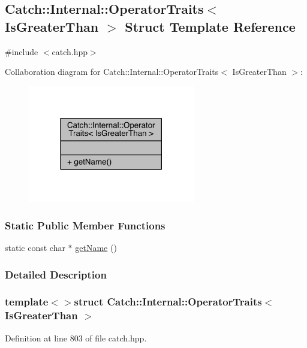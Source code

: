 \hypertarget{a00058}{}\subsection{Catch\+:\+:Internal\+:\+:Operator\+Traits$<$ Is\+Greater\+Than $>$ Struct Template Reference}
\label{a00058}


{\ttfamily \#include $<$catch.\+hpp$>$}



Collaboration diagram for Catch\+:\+:Internal\+:\+:Operator\+Traits$<$ Is\+Greater\+Than $>$\+:\nopagebreak
\begin{figure}[H]
\begin{center}
\leavevmode
\includegraphics[width=206pt]{a00326}
\end{center}
\end{figure}
\subsubsection*{Static Public Member Functions}
\begin{DoxyCompactItemize}
\item 
static const char $\ast$ \hyperlink{a00058_ab917bfb9ccbe461dc684ee5a34d67d27}{get\+Name} ()
\end{DoxyCompactItemize}


\subsubsection{Detailed Description}
\subsubsection*{template$<$$>$struct Catch\+::\+Internal\+::\+Operator\+Traits$<$ Is\+Greater\+Than $>$}



Definition at line 803 of file catch.\+hpp.



